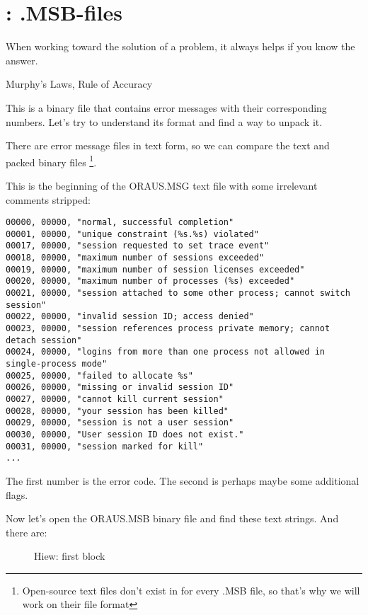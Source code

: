 ﻿\section{\oracle: .MSB-files\ESph{}\PTBRph{}\PLph{}\ITAph{}\DEph{}\NLph{}}
\myindex{\oracle}
\epigraph{When working toward the solution of a problem, it always helps if you know the answer.}{Murphy's Laws, Rule of Accuracy}

This is a binary file that contains error messages with their corresponding numbers.
Let's try to understand 
its format and find a way to unpack it.

There are \oracle error message files in text form, 
so we can compare the text and packed binary files
\footnote{Open-source text files don't exist in \oracle for every .MSB file, so that's why we will work on their file format}.

This is the beginning of the ORAUS.MSG text file with some irrelevant comments stripped:

\begin{lstlisting}[caption=Beginning of ORAUS.MSG file without comments]
00000, 00000, "normal, successful completion"
00001, 00000, "unique constraint (%s.%s) violated"
00017, 00000, "session requested to set trace event"
00018, 00000, "maximum number of sessions exceeded"
00019, 00000, "maximum number of session licenses exceeded"
00020, 00000, "maximum number of processes (%s) exceeded"
00021, 00000, "session attached to some other process; cannot switch session"
00022, 00000, "invalid session ID; access denied"
00023, 00000, "session references process private memory; cannot detach session"
00024, 00000, "logins from more than one process not allowed in single-process mode"
00025, 00000, "failed to allocate %s"
00026, 00000, "missing or invalid session ID"
00027, 00000, "cannot kill current session"
00028, 00000, "your session has been killed"
00029, 00000, "session is not a user session"
00030, 00000, "User session ID does not exist."
00031, 00000, "session marked for kill"
...
\end{lstlisting}

The first number is the error code.
The second is perhaps maybe some additional flags.

\clearpage
Now let's open the ORAUS.MSB 
binary file and find these text strings. 
And there are:

\begin{figure}[H]
\centering
{}
\caption{Hiew: first block}
\label{fig:oracle_MSB_1}
\end{figure}


